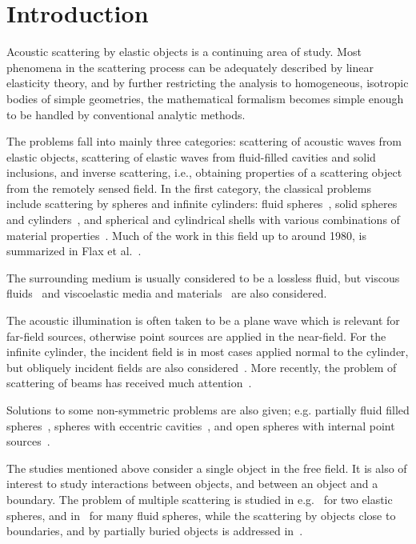 \section{Introduction}
Acoustic scattering by elastic objects is a continuing area of study. Most phenomena in the scattering process can be adequately described by linear elasticity theory, and by further restricting the analysis to homogeneous, isotropic bodies of simple geometries, the mathematical formalism becomes simple enough to be handled by conventional analytic methods. 

The problems fall into mainly three categories: scattering of acoustic waves from elastic objects, scattering of elastic waves from fluid-filled cavities and solid inclusions, and inverse scattering, i.e., obtaining properties of a scattering object from the remotely sensed field. In the first category, the classical problems include scattering by spheres and infinite cylinders: fluid spheres~\cite{Anderson1950ssf}, solid spheres and cylinders~\cite{Faran1951ssb, Anderson1955soa, Hickling1962aoe, Doolittle1968ssb, Flax1978toe, Gaunaurd1983rao}, and spherical and cylindrical shells with various combinations of material properties~\cite{Hickling1964aoe, Doolittle1966ssb, Gaunaurd1987lac, Gaunaurd1991ssb, Kaduchak1998rbm, Chang1994voa, Chang1994soa, Fender1972sfa}. 
Much of the work in this field up to around 1980, is summarized in Flax et al.~\cite{Flax1981pa}.

The surrounding medium is usually considered to be a lossless fluid, but viscous fluids~\cite{Lin1983asb} and viscoelastic media and materials~\cite{Hasheminejad2005asf} are also considered. 

The acoustic illumination is often taken to be a plane wave which is relevant for far-field sources, otherwise point sources are applied in the near-field. For the infinite cylinder, the incident field is in most cases applied normal to the cylinder, but obliquely incident fields are also considered~\cite{Bao1990ras, Daneshjou2017aes}. More recently, the problem of scattering of beams has received much attention~\cite{Marston2007abs, Gong2016aso}. 

Solutions to some non-symmetric problems are also given; e.g. partially fluid filled spheres~\cite{Fawcett2001sfa}, spheres with eccentric cavities~\cite{Hasheminejad2005asf}, and open spheres with internal point sources~\cite{Elias1991sba}.

The studies mentioned above consider a single object in the free field. It is also of interest to study interactions between objects, and between an object and a boundary. The problem of multiple scattering is studied in e.g.~\cite{Gabrielli2001asb} for two elastic spheres, and in~\cite{Wu2006mso} for many fluid spheres, while the scattering by objects close to boundaries, and by  partially buried objects is addressed in~\cite{Zampolli2009bpf}.


